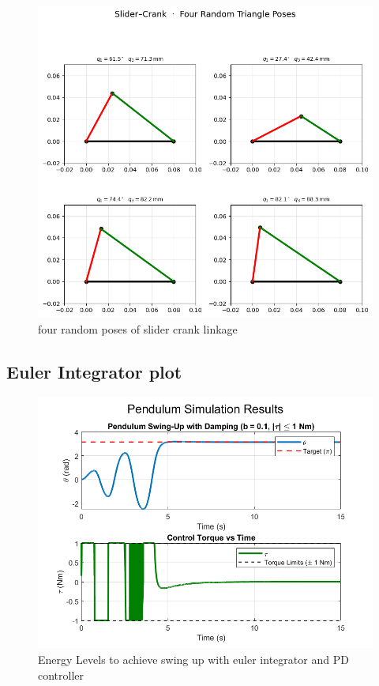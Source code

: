 \documentclass[12pt,a4paper]{article}
\begin{document}
\begin{figure}[htbp]
  \centering
  \includegraphics[width=0.9\linewidth]{../figs/exercise_5_2.png}
  \caption{four random poses of slider crank linkage}
  \label{fig:slider crank}
\end{figure}

\subsection{Euler Integrator plot}
\begin{figure}[htbp]
  \centering
  \includegraphics[width=0.9\linewidth]{../figs/pd_swing_up.png}
  \caption{Energy Levels to achieve swing up with euler integrator and PD controller}
  \label{fig:pd_swing_up}
\end{figure}
\end{document}
